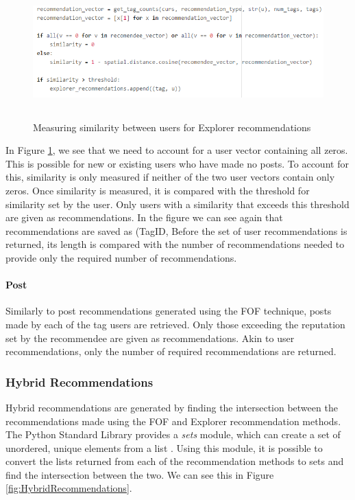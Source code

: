 \begin{figure}[H]
\centering
\includegraphics[height=2in]{Images/Implementation/ExplorerSimilarity}
\caption{Measuring similarity between users for Explorer recommendations}
\label{fig:ExplorerSimilarity}
\end{figure}

\noindent In Figure \ref{fig:ExplorerSimilarity}, we see that we need to account for a user vector containing all zeros. This is possible for new or existing users who have made no posts. To account for this, similarity is only measured if neither of the two user vectors contain only zeros. Once similarity is measured, it is compared with the threshold for similarity set by the user. Only users with a similarity that exceeds this threshold are given as recommendations. In the figure we can see again that recommendations are saved as (TagID, Before the set of user recommendations is returned, its length is compared with the number of recommendations needed to provide only the required number of recommendations. 

\paragraph{Post} Similarly to post recommendations generated using the FOF technique, posts made by each of the tag users are retrieved. Only those exceeding the reputation set by the recommendee are given as recommendations. Akin to user recommendations, only the number of required recommendations are returned.

\subsubsection{Hybrid Recommendations}
Hybrid recommendations are generated by finding the intersection between the recommendations made using the FOF and Explorer recommendation methods. The Python Standard Library provides a \textit{sets} module, which can create a set of unordered, unique elements from a list \cite{Python:Sets}. Using this module, it is possible to convert the lists returned from each of the recommendation methods to sets and find the intersection between the two. We can see this in Figure \ref{fig:HybridRecommendations}.

